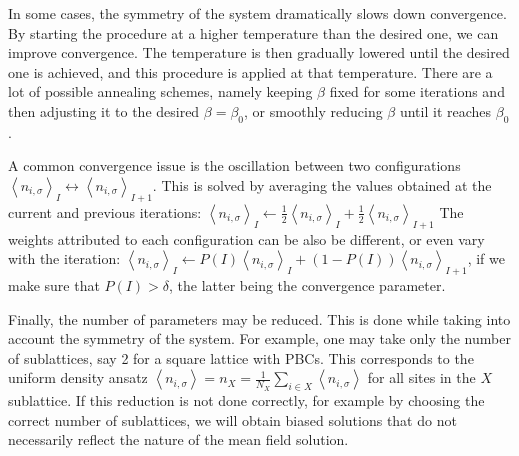 In some cases, the symmetry of the system dramatically slows down convergence.
By starting the procedure at a higher temperature than the desired one, we can improve convergence.
The temperature is then gradually lowered until the desired one is achieved, and this procedure is applied at that temperature.
There are a lot of possible annealing schemes, namely keeping $\beta$ fixed for some iterations and then adjusting it to the desired $\beta = \beta_0$, or smoothly reducing $\beta$ until it reaches $\beta_0$.

A common convergence issue is the oscillation between two configurations $\left\langle n_{i,\sigma}\right\rangle_I \leftrightarrow \left\langle n_{i,\sigma}\right\rangle_{I+1}$.
This is solved by averaging the values obtained at the current and previous iterations: $\left\langle n_{i,\sigma}\right\rangle_I \leftarrow \frac{1}{2} \left\langle n_{i,\sigma}\right\rangle_I + \frac{1}{2} \left\langle n_{i,\sigma}\right\rangle_{I+1}$
The weights attributed to each configuration can be also be different, or even vary with the iteration: $\left\langle n_{i,\sigma}\right\rangle_I \leftarrow P(I) \left\langle n_{i,\sigma}\right\rangle_I + (1 - P(I) ) \left\langle n_{i,\sigma}\right\rangle_{I+1}$, if we make sure that $P(I) > \delta$, the latter being the convergence parameter.

Finally, the number of parameters may be reduced.
This is done while taking into account the symmetry of the system.
For example, one may take only the number of sublattices, say 2 for a square lattice with \acp{PBC}.
This corresponds to the uniform density ansatz $\left\langle n_{i,\sigma} \right\rangle = n_X = \frac{1}{N_X} \sum_{i \in X} \left\langle n_{i,\sigma} \right\rangle$ for all sites in the $X$ sublattice.
If this reduction is not done correctly, for example by choosing the correct number of sublattices, we will obtain biased solutions that do not necessarily reflect the nature of the mean field solution.
